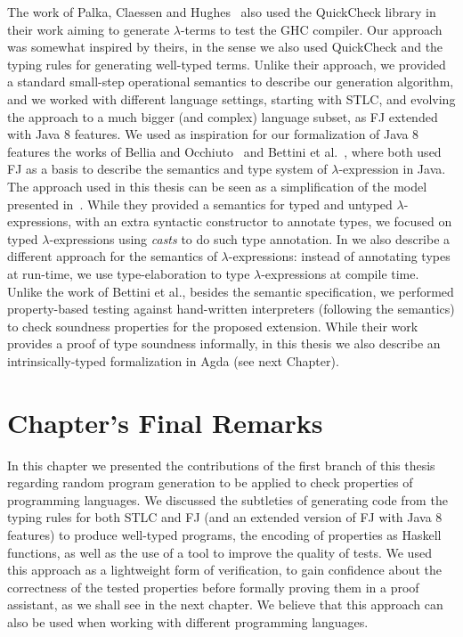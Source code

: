 \documentclass[tese,capa,english]{texufpel}
\begin{document}
The work of Palka, Claessen and Hughes~\cite{Palka:2011:TOC:1982595.1982615} also used the QuickCheck library in their work aiming to generate $\lambda$-terms to test the GHC compiler. Our approach was somewhat inspired by theirs, in the sense we also used QuickCheck and the typing rules for generating well-typed terms. Unlike their approach, we provided a standard small-step operational semantics to describe our generation algorithm, and we worked with different language settings, starting with STLC, and evolving the approach to a much bigger (and complex) language subset, as FJ extended with Java 8 features. We used as inspiration for our formalization of Java 8 features the works of Bellia and Occhiuto~\cite{Bellia:2011:PJS:2361335.2361338} and Bettini et al.~\cite{Bettini2018JavaL}, where both used FJ as a basis to describe the semantics and type system of $\lambda$-expression in Java. The approach used in this thesis can be seen as a simplification of the model presented in~\cite{Bettini2018JavaL}. While they provided a semantics for typed and untyped $\lambda$-expressions, with an extra syntactic constructor to annotate types, we focused on typed $\lambda$-expressions using \emph{casts} to do such type annotation. In \cite{feitosa2018-3} we also describe a different approach for the semantics of $\lambda$-expressions: instead of annotating types at run-time, we use type-elaboration to type $\lambda$-expressions at compile time. Unlike the work of Bettini et al., besides the semantic specification, we performed property-based testing against hand-written interpreters (following the semantics) to check soundness properties for the proposed extension. While their work provides a proof of type soundness informally, in this thesis we
also describe an intrinsically-typed formalization in Agda (see next Chapter).

\pagebreak

\section{Chapter's Final Remarks}

In this chapter we presented the contributions of the first branch of this thesis regarding random program generation to be applied to check properties of programming languages. We discussed the subtleties of generating code from the typing rules for both STLC and FJ (and an extended version of FJ with Java 8 features) to produce well-typed programs, the encoding of properties as Haskell functions, as well as the use of a tool to improve the quality of tests. We used this approach as a lightweight form of verification, to gain confidence about the correctness of the tested properties before formally proving them in a proof assistant, as we shall see in the next chapter. We believe that this approach can also be used when working with different programming languages.
\end{document}
